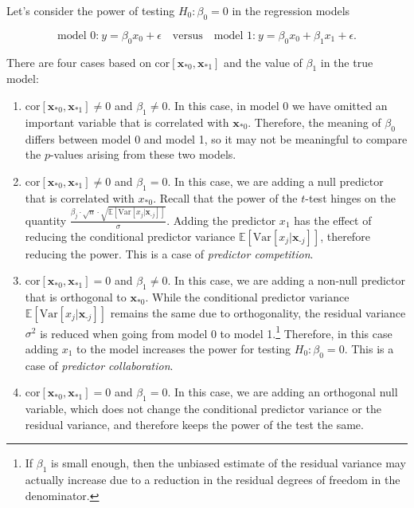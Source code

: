 \documentclass[
  11pt,
  letterpaper,
  oneside]{book}
\providecommand{\tightlist}{%
  \setlength{\itemsep}{0pt}\setlength{\parskip}{0pt}}\usepackage{longtable,booktabs,array}
\theoremstyle{definition}
\theoremstyle{plain}
\theoremstyle{plain}
\theoremstyle{plain}
\theoremstyle{remark}
\begin{document}
Let's consider the power of testing \(H_0: \beta_0 = 0\) in the
regression models

\[
\text{model 0:}\ y = \beta_0 x_0 + \epsilon \quad \text{versus} \quad \text{model 1:}\ y = \beta_0 x_0 + \beta_1 x_1 + \epsilon.
\]

There are four cases based on
\(\text{cor}[\boldsymbol{x}_{*0}, \boldsymbol{x}_{*1}]\) and the value
of \(\beta_1\) in the true model:

\begin{enumerate}
\def\labelenumi{\arabic{enumi}.}
\tightlist
\item
  \(\text{cor}[\boldsymbol{x}_{*0}, \boldsymbol{x}_{*1}] \neq 0\) and
  \(\beta_1 \neq 0\). In this case, in model 0 we have omitted an
  important variable that is correlated with \(\boldsymbol{x}_{*0}\).
  Therefore, the meaning of \(\beta_0\) differs between model 0 and
  model 1, so it may not be meaningful to compare the \(p\)-values
  arising from these two models.
\item
  \(\text{cor}[\boldsymbol{x}_{*0}, \boldsymbol{x}_{*1}] \neq 0\) and
  \(\beta_1 = 0\). In this case, we are adding a null predictor that is
  correlated with \(x_{*0}\). Recall that the power of the \(t\)-test
  hinges on the quantity
  \(\frac{\beta_j \cdot \sqrt{n} \cdot \sqrt{\mathbb{E}[\text{Var}[x_j|\boldsymbol{x}_{\text{-}j}]]}}{\sigma}\).
  Adding the predictor \(x_1\) has the effect of reducing the
  conditional predictor variance
  \(\mathbb{E}[\text{Var}[x_j|\boldsymbol{x}_{\text{-}j}]]\), therefore
  reducing the power. This is a case of \emph{predictor competition}.
\item
  \(\text{cor}[\boldsymbol{x}_{*0}, \boldsymbol{x}_{*1}] = 0\) and
  \(\beta_1 \neq 0\). In this case, we are adding a non-null predictor
  that is orthogonal to \(\boldsymbol{x}_{*0}\). While the conditional
  predictor variance
  \(\mathbb{E}[\text{Var}[x_j|\boldsymbol{x}_{\text{-}j}]]\) remains the
  same due to orthogonality, the residual variance \(\sigma^2\) is
  reduced when going from model 0 to model
  1.\footnote{If $\beta_1$ is small enough, then the unbiased estimate of the residual variance may actually increase due to a reduction in the residual degrees of freedom in the denominator.}
  Therefore, in this case adding \(x_1\) to the model increases the
  power for testing \(H_0: \beta_0 = 0\). This is a case of
  \emph{predictor collaboration}.
\item
  \(\text{cor}[\boldsymbol{x}_{*0}, \boldsymbol{x}_{*1}] = 0\) and
  \(\beta_1 = 0\). In this case, we are adding an orthogonal null
  variable, which does not change the conditional predictor variance or
  the residual variance, and therefore keeps the power of the test the
  same.
\end{enumerate}
\end{document}

